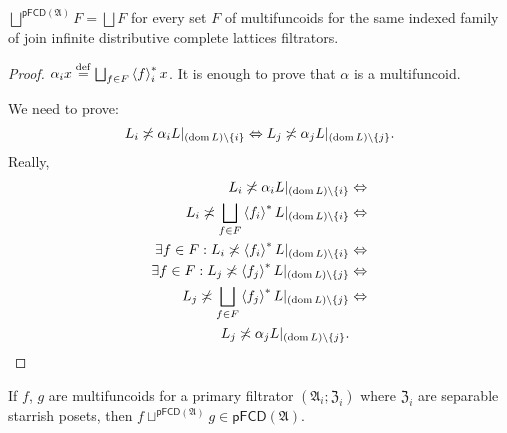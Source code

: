 \begin{thm}
$\bigsqcup^{\mathsf{pFCD}(\mathfrak{A})}F=\bigsqcup F$ for every
set $F$ of multifuncoids for the same indexed family of join infinite
distributive complete lattices filtrators.\end{thm}
\begin{proof}
$\alpha_{i}x\overset{\mathrm{def}}{=}\bigsqcup_{f\in F}\left\langle f\right\rangle ^{\ast}_{i}x$. It is enough to prove
that $\alpha$ is a multifuncoid.

We need to prove: 
\[
L_{i}\not\asymp\alpha_{i}L|_{(\operatorname{dom} L)\setminus\{i\}}\Leftrightarrow L_{j}\not\asymp\alpha_{j}L|_{(\operatorname{dom} L)\setminus\{j\}}.
\]
Really,
\begin{align*}
L_{i}\not\asymp\alpha_{i}L|_{(\operatorname{dom} L)\setminus\{i\}} & \Leftrightarrow\\
L_{i}\not\asymp\bigsqcup_{f\in F}\left\langle f_{i}\right\rangle ^{\ast}L|_{(\operatorname{dom} L)\setminus\{i\}} & \Leftrightarrow\\
\exists f\in F:L_{i}\not\asymp \left\langle f_{i}\right\rangle ^{\ast}L|_{(\operatorname{dom} L)\setminus\{i\}} & \Leftrightarrow\\
\exists f\in F:L_{j}\not\asymp \left\langle f_{j}\right\rangle ^{\ast}L|_{(\operatorname{dom} L)\setminus\{j\}} & \Leftrightarrow\\
L_{j}\not\asymp\bigsqcup_{f\in F}\left\langle f_{j}\right\rangle ^{\ast}L|_{(\operatorname{dom} L)\setminus\{j\}} & \Leftrightarrow\\
L_{j}\not\asymp\alpha_{j}L|_{(\operatorname{dom} L)\setminus\{j\}}.
\end{align*}
\end{proof}
\begin{thm}
If $f$, $g$ are multifuncoids for a primary filtrator $(\mathfrak{A}_{i};\mathfrak{Z}_{i})$
where $\mathfrak{Z}_{i}$ are separable starrish posets, then $f\sqcup^{\mathsf{pFCD}(\mathfrak{A})}g\in\mathsf{pFCD}(\mathfrak{A})$.\end{thm}

